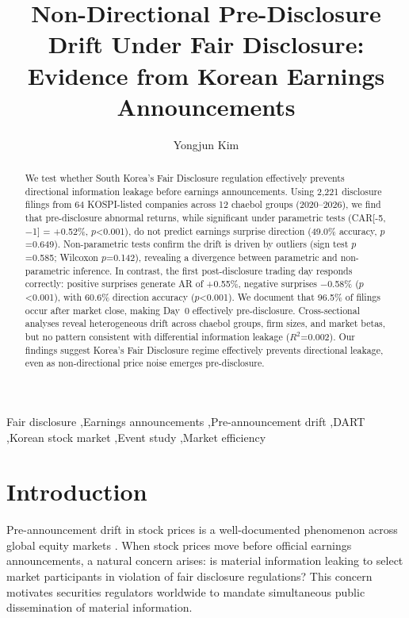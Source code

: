 \documentclass[review,authoryear]{elsarticle}
\begin{document}
\begin{frontmatter}

\title{Non-Directional Pre-Disclosure Drift Under Fair Disclosure: Evidence from Korean Earnings Announcements}

\author[ajou]{Yongjun Kim}

\address[ajou]{Department of Software, Ajou University, Suwon, South Korea}

\begin{abstract}
We test whether South Korea's Fair Disclosure regulation effectively prevents directional information leakage before earnings announcements. Using 2,221 disclosure filings from 64 KOSPI-listed companies across 12 chaebol groups (2020--2026), we find that pre-disclosure abnormal returns, while significant under parametric tests (CAR[-5,$-$1] = +0.52\%, $p$<0.001), do not predict earnings surprise direction (49.0\% accuracy, $p$=0.649). Non-parametric tests confirm the drift is driven by outliers (sign test $p$=0.585; Wilcoxon $p$=0.142), revealing a divergence between parametric and non-parametric inference. In contrast, the first post-disclosure trading day responds correctly: positive surprises generate AR of +0.55\%, negative surprises $-$0.58\% ($p$<0.001), with 60.6\% direction accuracy ($p$<0.001). We document that 96.5\% of filings occur after market close, making Day~0 effectively pre-disclosure. Cross-sectional analyses reveal heterogeneous drift across chaebol groups, firm sizes, and market betas, but no pattern consistent with differential information leakage ($R^2$=0.002). Our findings suggest Korea's Fair Disclosure regime effectively prevents directional leakage, even as non-directional price noise emerges pre-disclosure.
\end{abstract}

\begin{keyword}
Fair disclosure \sep Earnings announcements \sep Pre-announcement drift \sep DART \sep Korean stock market \sep Event study \sep Market efficiency
\end{keyword}

\end{frontmatter}

\section{Introduction}

Pre-announcement drift in stock prices is a well-documented phenomenon across global equity markets \citep{kaniel2012individual}. When stock prices move before official earnings announcements, a natural concern arises: is material information leaking to select market participants in violation of fair disclosure regulations? This concern motivates securities regulators worldwide to mandate simultaneous public dissemination of material information.
\end{document}
